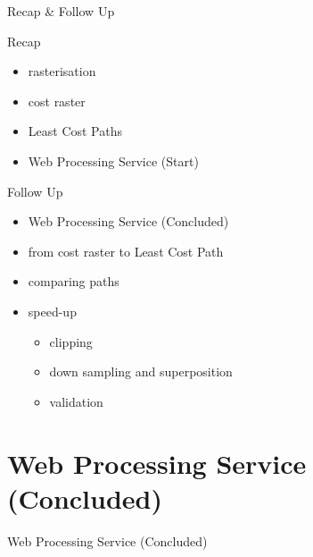 \documentclass[usenames,dvipsnames,aspectratio=169]{beamer}
\begin{document}
	
	\begin{frame}{Recap \& Follow Up}
		
		\begin{minipage}[t]{0.48\textwidth}
			Recap
			\begin{itemize}
				\item rasterisation
				\item cost  raster
				\item Least Cost Paths
				\item Web Processing Service (Start)
			\end{itemize}
		\end{minipage}
		\hfill	
		\begin{minipage}[t]{0.48\textwidth}
			Follow Up
			\begin{itemize}
				\item Web Processing Service (Concluded)
				\item from cost raster to Least Cost Path
				\item comparing paths
				\item speed-up
				\begin{itemize}
					\item clipping
					\item down sampling and superposition
					\item validation
				\end{itemize}
				
			\end{itemize}
		\end{minipage}
		
	\end{frame}
	
	
	\section{Web Processing Service (Concluded)}
	\begin{frame}{Web Processing Service (Concluded)}
	\centering

	\end{frame}
	
\end{document}
